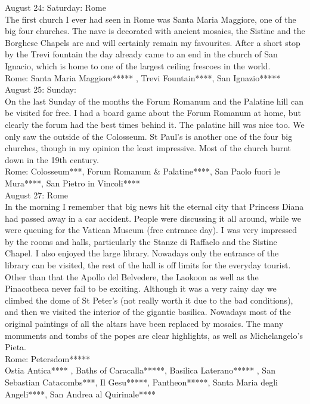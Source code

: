 August 24: Saturday: Rome\\
The first church I ever had seen in Rome was Santa Maria Maggiore, one of the big four churches. The nave is decorated with ancient mosaics, the Sistine and the Borghese Chapels are and will certainly remain my favourites. After a short stop by the Trevi fountain the day already came to an end in the church of San Ignacio, which is home to one of the largest ceiling frescoes in the world.\\

Rome: Santa Maria Maggiore***** , Trevi Fountain****, San Ignazio*****\\

August 25: Sunday:\\
On the last Sunday of the months the Forum Romanum and the Palatine hill can be visited for free. I had a board game about the Forum Romanum at home, but clearly the forum had the best times behind it. The palatine hill was nice too. We only saw the outside of the Colosseum. St Paul's is another one of the four big churches, though in my opinion the least impressive. Most of the church burnt down in the 19th century.\\

Rome: Colosseum***, Forum Romanum \& Palatine****, San Paolo fuori le Mura****, San Pietro in Vincoli****\\


August 27: Rome\\
In the morning I remember that big news hit the eternal city that Princess Diana had passed away in a car accident. People were discussing it all around, while we were queuing for the Vatican Museum (free entrance day). I was very impressed by the rooms and halls, particularly the Stanze di Raffaelo and the Sistine Chapel. I also enjoyed the large library. Nowadays only the entrance of the library can be visited, the rest of the hall is off limits for the everyday tourist. Other than that the Apollo del Belvedere, the Laokoon as well as the Pinacotheca never fail to be exciting. Although it was a very rainy day we climbed the dome of St Peter's (not really worth it due to the bad conditions), and then we visited the interior of the gigantic basilica. Nowadays most of the original paintings of all the altars have been replaced by mosaics. The many monuments and tombs of the popes are clear highlights, as well as Michelangelo's Pieta.\\  

Rome: Petersdom*****\\





Ostia Antica**** , Baths of Caracalla*****, Basilica Laterano***** , San Sebastian Catacombs***,  Il Gesu*****, Pantheon*****, Santa Maria degli Angeli****, San Andrea al Quirinale****